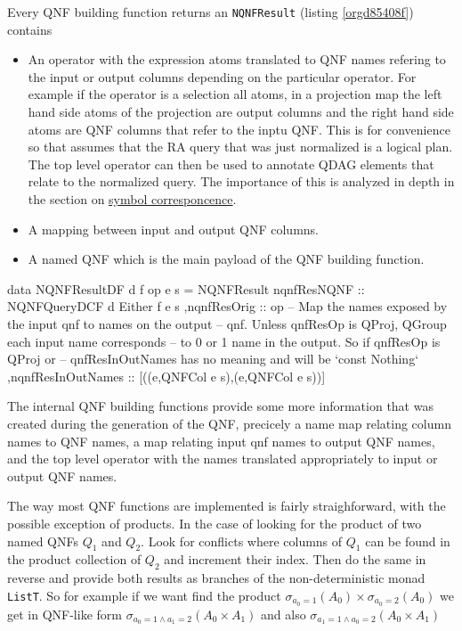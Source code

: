 Every QNF building function returns an \texttt{NQNFResult} (listing
\ref{orgd85408f}) contains

\begin{itemize}
\item An operator with the expression atoms translated to QNF names
  refering to the input or output columns depending on the particular
  operator. For example if the operator is a selection all atoms, in a
  projection map the left hand side atoms of the projection are output
  columns and the right hand side atoms are QNF columns that refer to
  the inptu QNF. This is for convenience so that assumes that the RA
  query that was just normalized is a logical plan. The top level
  operator can then be used to annotate QDAG elements that relate to
  the normalized query. The importance of this is analyzed in depth in
  the section on \hyperref[sec:orgcc899ec]{symbol corresponcence}.
\item A mapping between input and output QNF columns.
\item A  named QNF which is the main payload of the QNF building function.
\end{itemize}

\begin{listing}[p]
  \begin{haskell}
    data NQNFResultDF d f op e s =
    NQNFResult
    { nqnfResNQNF :: NQNFQueryDCF d Either f e s
      ,nqnfResOrig :: op
      -- Map the names exposed by the input qnf to names on the output
      -- qnf. Unless qnfResOp is QProj, QGroup each input name corresponds
      -- to 0 or 1 name in the output. So if qnfResOp is QProj or
      -- qnfResInOutNames has no meaning and will be `const Nothing`
      ,nqnfResInOutNames :: [((e,QNFCol e s),(e,QNFCol e s))]
    }
  \end{haskell}
  \caption{\label{orgd85408f}The internal QNF building functions provide some more information that was created during the generation of the QNF, precicely a name map relating column names to QNF names,  a map relating input qnf names to output QNF names, and the top level operator with the names translated appropriately to input or output QNF names.}
\end{listing}

The way most QNF functions are implemented is fairly straighforward,
with the possible exception of products. In the case of looking for
the product of two named QNFs \(Q_1\) and \(Q_2\).  Look for conflicts
where columns of \(Q_1\) can be found in the product collection of
\(Q_2\) and increment their index. Then do the same in reverse and
provide both results as branches of the non-deterministic monad
\texttt{ListT}. So for example if we want find the product
\(\sigma_{a_0=1}(A_0) \times \sigma_{a_0=2}(A_0)\) we get in QNF-like
form \(\sigma_{a_0=1 \land a_1=2} (A_0 \times A_1)\) and also
\(\sigma_{a_1=1 \land a_0=2} (A_0 \times A_1)\)


